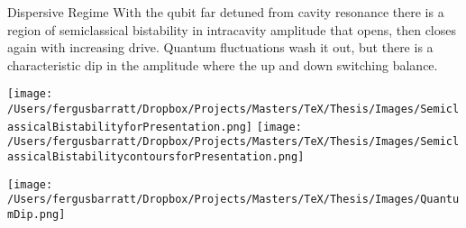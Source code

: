 \documentclass{beamer}
\begin{document}
\begin{frame}{Dispersive Regime}
        With the qubit far detuned from cavity resonance there is a region of semiclassical bistability in intracavity amplitude that opens, then closes again with increasing drive. Quantum fluctuations wash it out, but there is a characteristic dip in the amplitude where the up and down switching balance.

        \texttt{[image: /Users/fergusbarratt/Dropbox/Projects/Masters/TeX/Thesis/Images/SemiclassicalBistabilityforPresentation.png]}
        \texttt{[image: /Users/fergusbarratt/Dropbox/Projects/Masters/TeX/Thesis/Images/SemiclassicalBistabilitycontoursforPresentation.png]}
\end{frame}
\begin{frame}
      \begin{center}
      \texttt{[image: /Users/fergusbarratt/Dropbox/Projects/Masters/TeX/Thesis/Images/QuantumDip.png]}
      \end{center}
\end{frame}
\end{document}

